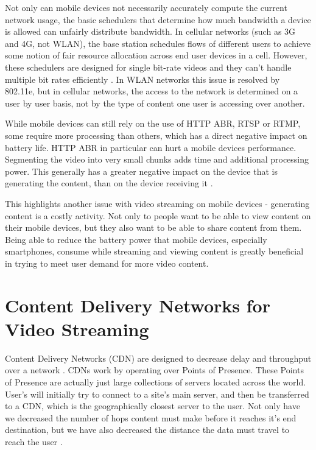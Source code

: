 \documentclass[12pt]{article}
\begin{document}
Not only can mobile devices not necessarily accurately compute the current network usage, the basic schedulers that determine how much bandwidth a device is allowed can unfairly distribute bandwidth.  In cellular networks (such as 3G and 4G, not WLAN), the base station schedules flows of different users to achieve some notion of fair resource allocation across end user devices in a cell. However, these schedulers are designed for single bit-rate videos and they can’t handle multiple bit rates efficiently \cite{10287427420150501}.  In WLAN networks this issue is resolved by 802.11e, but in cellular networks, the access to the network is determined on a user by user basis, not by the type of content one user is accessing over another.

While mobile devices can still rely on the use of HTTP ABR, RTSP or RTMP, some require more processing than others, which has a direct negative impact on battery life.  HTTP ABR in particular can hurt a mobile devices performance.  Segmenting the video into very small chunks adds time and additional processing power.  This generally has a greater negative impact on the device that is generating the content, than on the device receiving it \cite{11720476820160701}.

This highlights another issue with video streaming on mobile devices - generating content is a costly activity.  Not only to people want to be able to view content on their mobile devices, but they also want to be able to share content from them.  Being able to reduce the battery power that mobile devices, especially smartphones, consume while streaming and viewing content is greatly beneficial in trying to meet user demand for more video content.

\section{Content Delivery Networks for Video Streaming}
Content Delivery Networks (CDN) are designed to decrease delay and throughput over a network \cite{6089062}.  CDNs work by operating over Points of Presence.  These Points of Presence are actually just large collections of servers located across the world.  User's will initially try to connect to a site's main server, and then be transferred to a CDN, which is the geographically closest server to the user.  Not only have we decreased the number of hops content must make before it reaches it's end destination, but we have also decreased the distance the data must travel to reach the user \cite{cdn_tutorial}.
\end{document}
